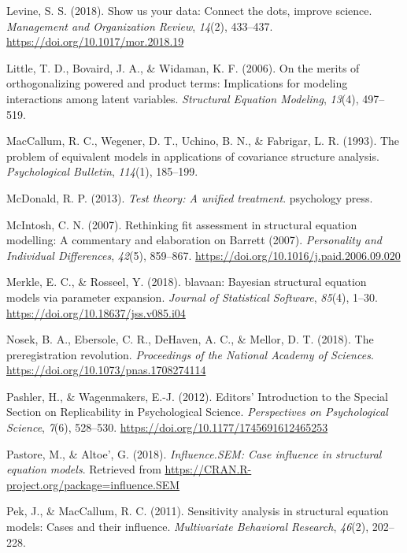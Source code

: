 \documentclass[
  english,
  man]{apa6}
\newlength{\cslhangindent}
\newenvironment{cslreferences}%
  {\setlength{\parindent}{0pt}%
  \everypar{\setlength{\hangindent}{\cslhangindent}}\ignorespaces}%
  {\par}
\begin{document}
\begin{cslreferences}
\leavevmode\hypertarget{ref-Levine2018}{}%
Levine, S. S. (2018). Show us your data: Connect the dots, improve science. \emph{Management and Organization Review}, \emph{14}(2), 433--437. \url{https://doi.org/10.1017/mor.2018.19}

\leavevmode\hypertarget{ref-little2006merits}{}%
Little, T. D., Bovaird, J. A., \& Widaman, K. F. (2006). On the merits of orthogonalizing powered and product terms: Implications for modeling interactions among latent variables. \emph{Structural Equation Modeling}, \emph{13}(4), 497--519.

\leavevmode\hypertarget{ref-MacCallum93}{}%
MacCallum, R. C., Wegener, D. T., Uchino, B. N., \& Fabrigar, L. R. (1993). The problem of equivalent models in applications of covariance structure analysis. \emph{Psychological Bulletin}, \emph{114}(1), 185--199.

\leavevmode\hypertarget{ref-mcdonald2013test}{}%
McDonald, R. P. (2013). \emph{Test theory: A unified treatment}. psychology press.

\leavevmode\hypertarget{ref-McIntosh2007}{}%
McIntosh, C. N. (2007). Rethinking fit assessment in structural equation modelling: A commentary and elaboration on Barrett (2007). \emph{Personality and Individual Differences}, \emph{42}(5), 859--867. \url{https://doi.org/10.1016/j.paid.2006.09.020}

\leavevmode\hypertarget{ref-blavaan}{}%
Merkle, E. C., \& Rosseel, Y. (2018). blavaan: Bayesian structural equation models via parameter expansion. \emph{Journal of Statistical Software}, \emph{85}(4), 1--30. \url{https://doi.org/10.18637/jss.v085.i04}

\leavevmode\hypertarget{ref-Nosek2018}{}%
Nosek, B. A., Ebersole, C. R., DeHaven, A. C., \& Mellor, D. T. (2018). The preregistration revolution. \emph{Proceedings of the National Academy of Sciences}. \url{https://doi.org/10.1073/pnas.1708274114}

\leavevmode\hypertarget{ref-Pashler2012a}{}%
Pashler, H., \& Wagenmakers, E.-J. (2012). Editors' Introduction to the Special Section on Replicability in Psychological Science. \emph{Perspectives on Psychological Science}, \emph{7}(6), 528--530. \url{https://doi.org/10.1177/1745691612465253}

\leavevmode\hypertarget{ref-influenceSEM}{}%
Pastore, M., \& Altoe', G. (2018). \emph{Influence.SEM: Case influence in structural equation models}. Retrieved from \url{https://CRAN.R-project.org/package=influence.SEM}

\leavevmode\hypertarget{ref-pek2011sensitivity}{}%
Pek, J., \& MacCallum, R. C. (2011). Sensitivity analysis in structural equation models: Cases and their influence. \emph{Multivariate Behavioral Research}, \emph{46}(2), 202--228.


\end{cslreferences}
\end{document}
